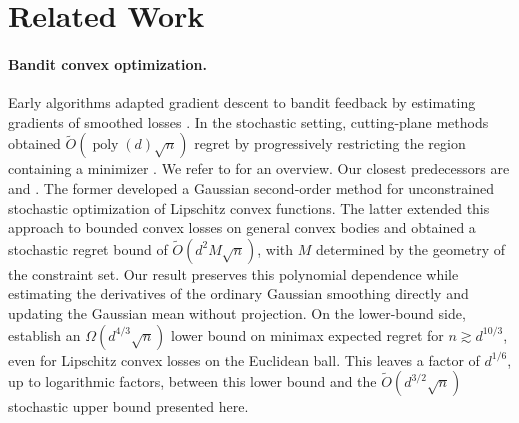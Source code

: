 \documentclass[12pt,cleveref]{jmlr}
\newcommand{\1}{\mathbf 1}
\begin{document}
\section{Related Work}
\label{sec:related-work}

\paragraph{Bandit convex optimization.}
Early algorithms adapted gradient descent to bandit feedback by
estimating gradients of smoothed losses
\citep{kleinberg2004nearly,flaxman2005online}.
In the stochastic setting, cutting-plane methods obtained
$\widetilde O(\operatorname{poly}(d)\sqrt n)$ regret by progressively
restricting the region containing a minimizer
\citep{agarwal2013stochastic,lattimore2021improved}.
We refer to \citet[Chapters~2,~5,~9 and~10]{lattimore2026bandit}
for an overview.
Our closest predecessors are \citet{lattimore2023second} and
\citet{fokkema2024online}. The former developed a Gaussian second-order
method for unconstrained stochastic optimization of Lipschitz convex
functions. The latter extended this approach to bounded convex losses on
general convex bodies and obtained a stochastic regret bound of
$\widetilde O(d^2M\sqrt n)$, with $M$ determined by the geometry of the
constraint set. Our result preserves this polynomial dependence while
estimating the derivatives of the ordinary Gaussian smoothing directly
and updating the Gaussian mean without projection.
On the lower-bound side, \citet{rajaraman2026price} establish an
$\Omega(d^{4/3}\sqrt n)$ lower bound on minimax expected regret for
$n\gtrsim d^{10/3}$, even for Lipschitz convex losses on the Euclidean ball.
This leaves a factor of $d^{1/6}$, up to logarithmic factors, between
this lower bound and the $\widetilde O(d^{3/2}\sqrt n)$ stochastic
upper bound presented here.
\end{document}
